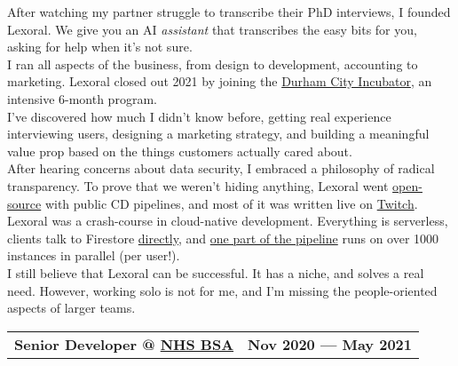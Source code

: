 \documentclass[hidelinks, 12pt, a4paper]{article}
\begin{document}
	\begin{multicols}{2}
		After watching my partner struggle to transcribe their PhD interviews, I founded Lexoral.
		We give you an AI \emph{assistant} that transcribes the easy bits for you, asking for help when it's not sure.\\
		
		I ran all aspects of the business, from design to development, accounting to marketing.
		Lexoral closed out 2021 by joining the \href{https://dcincubator.co.uk/}{Durham City Incubator}, an intensive 6-month program.\\
		
		I've discovered how much I didn't know before, getting real experience interviewing users, designing a marketing strategy, and building a meaningful value prop based on the things customers actually cared about.\\
		
		After hearing concerns about data security, I embraced a philosophy of radical transparency.
		To prove that we weren't hiding anything, Lexoral went \href{https://github.com/stevenwaterman/Lexoral/}{open-source} with public CD pipelines, and most of it was written live on \href{https://twitch.tv/lexoral}{Twitch}.\\
		
		Lexoral was a crash-course in cloud-native development.
		Everything is serverless, clients talk to Firestore \href{https://lexoral.com/blog/svelte-firestore-binding/}{directly}, and \href{https://twitter.com/SteWaterman/status/1445041856023339011}{one part of the pipeline} runs on over 1000 instances in parallel (per user!).\\
		
		I still believe that Lexoral can be successful.
		It has a niche, and solves a real need.
		However, working solo is not for me, and I'm missing the people-oriented aspects of larger teams.\\
		
	\end{multicols}


	\begin{tabularx}{\linewidth}{@{}Xr@{}}
		\textbf{Senior Developer @ \href{https://www.nhsbsa.nhs.uk/}{NHS BSA}} & \textbf{Nov 2020 --- May 2021}
	\end{tabularx}\vspace{2pt}
	
\end{document}
